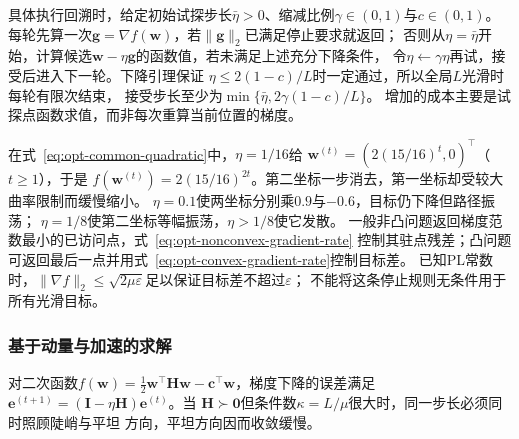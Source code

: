 具体执行回溯时，给定初始试探步长$\bar\eta>0$、缩减比例$\gamma\in(0,1)$与$c\in(0,1)$。
每轮先算一次$\bm g=\nabla f(\bm w)$，若$\|\bm g\|_2$已满足停止要求就返回；
否则从$\eta=\bar\eta$开始，计算候选$\bm w-\eta\bm g$的函数值，若未满足上述充分下降条件，
令$\eta\leftarrow\gamma\eta$再试，接受后进入下一轮。下降引理保证
$\eta\leq2(1-c)/L$时一定通过，所以全局$L$光滑时每轮有限次结束，
接受步长至少为$\min\{\bar\eta,2\gamma(1-c)/L\}$。
增加的成本主要是试探点函数求值，而非每次重算当前位置的梯度。

在式~\eqref{eq:opt-common-quadratic}中，$\eta=1/16$给
$\bm w^{(t)}=(2(15/16)^t,0)^\top$（$t\geq1$），于是
$f(\bm w^{(t)})=2(15/16)^{2t}$。第二坐标一步消去，第一坐标却受较大曲率限制而缓慢缩小。
$\eta=0.1$使两坐标分别乘$0.9$与$-0.6$，目标仍下降但路径振荡；
$\eta=1/8$使第二坐标等幅振荡，$\eta>1/8$使它发散。
一般非凸问题返回梯度范数最小的已访问点，式~\eqref{eq:opt-nonconvex-gradient-rate}
控制其驻点残差；凸问题可返回最后一点并用式~\eqref{eq:opt-convex-gradient-rate}控制目标差。
已知PL常数时，$\|\nabla f\|_2\leq\sqrt{2\mu\varepsilon}$足以保证目标差不超过$\varepsilon$；
不能将这条停止规则无条件用于所有光滑目标。

\subsubsection{基于动量与加速的求解}
\label{sec:opt-curvature-acceleration}

对二次函数$f(\bm{w})=\frac12\bm{w}^{\top}\bm{H}\bm{w}
-\bm{c}^{\top}\bm{w}$，梯度下降的误差满足
$\bm{e}^{(t+1)}=(\bm{I}-\eta\bm{H})\bm{e}^{(t)}$。当
$\bm{H}\succ\bm{0}$但条件数$\kappa=L/\mu$很大时，同一步长必须同时照顾陡峭与平坦
方向，平坦方向因而收敛缓慢。

